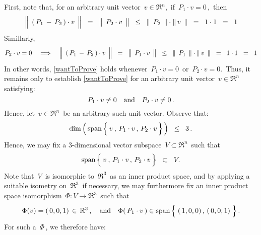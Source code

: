 First, note that, for an arbitrary unit vector \,$v \in \Re^{n}$,\,
if \,$P_{1} \cdot v = 0$\,,\, then
\begin{equation*}
\left\Vert\;\, (\,P_{1} \,\overset{{\color{white}.}}{-}\, P_{2}\,)\cdot v \,\;\right\Vert
\;\; = \;\;
	\left\Vert\;\, P_{2} \overset{{\color{white}.}}{\cdot} v \,\;\right\Vert
\;\; \leq \;\;
	\left\Vert\;\, P_{2} \,\;\right\Vert
	\cdot
	\left\Vert\, v \,\;\right\Vert
\;\; = \;\;
	1 \cdot 1
\;\; = \;\;
	1
\end{equation*}
Simillarly,
\begin{equation*}
P_{2} \cdot v = 0
\quad\Longrightarrow\quad
\left\Vert\;\, (\,P_{1} \,\overset{{\color{white}.}}{-}\, P_{2}\,)\cdot v \,\;\right\Vert
\;\; = \;\;
	\left\Vert\;\, P_{1} \overset{{\color{white}.}}{\cdot} v \,\;\right\Vert
\;\; \leq \;\;
	\left\Vert\;\, P_{1} \,\;\right\Vert
	\cdot
	\left\Vert\, v \,\;\right\Vert
\;\; = \;\;
	1 \cdot 1
\;\; = \;\;
	1
\end{equation*}
In other words, \eqref{wantToProve} holds whenever
\,$P_{1}\cdot v = 0$\, or \,$P_{2}\cdot v = 0$.\,
Thus, it remains only to establish \eqref{wantToProve}
for an arbitrary unit vector \,$v \in \Re^{n}$\, satisfying:
\begin{equation}\label{caseAssumption}
P_{1} \cdot v \neq 0
\quad\textnormal{and}\quad
P_{2} \cdot v \neq 0\,.
\end{equation}
Hence, let \,$v \in \Re^{n}$\, be an arbitrary such unit vector.
Observe that:
\begin{equation*}
\dim\left(\,\span\left\{\,\overset{{\color{white}-}}{v} \,,\, P_{1}\cdot v \,,\, P_{2}\cdot v\,\right\}\,\right)
\;\; \leq \;\;
	3\,.
\end{equation*}
Hence, we may fix a $3$-dimensional vector subspace \,$V \subset \Re^{n}$\, such that
\begin{equation*}
\span\left\{\,\overset{{\color{white}-}}{v} \,,\, P_{1}\cdot v \,,\, P_{2}\cdot v\,\right\}
\;\; \subset \;\;
	V.
\end{equation*}
Note that \,$V$\, is isomorphic to \,$\Re^{3}$\, as an inner product space,
and by applying a suitable isometry on \,$\Re^{3}$\, if necessary,
we may furthermore fix an inner product space isomorphism \,$\Phi : V \longrightarrow \Re^{3}$\,
such that
\begin{equation*}
\Phi(v) = (\,0,0,1) \,\in\, \Re^{3}\,,
\quad\textnormal{and}\quad
\Phi(\,P_{1}\cdot v\,) \in \span\left\{\;(\,\overset{{\color{white}.}}{1},0,0) \,,\, (\,0,0,1)\;\right\}.
\end{equation*}
For such a \,$\Phi$\,, we therefore have:
